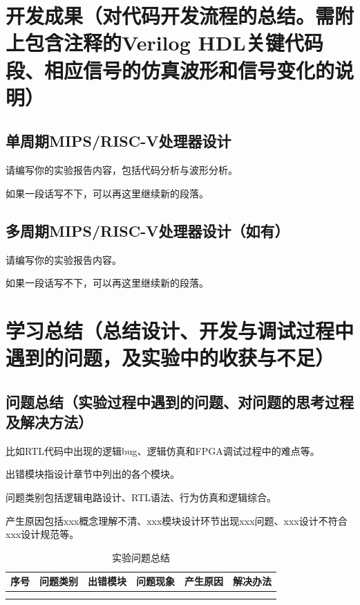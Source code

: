 \documentclass[11pt]{article}
\begin{document}
\section{开发成果（对代码开发流程的总结。需附上包含注释的Verilog HDL关键代码段、相应信号的仿真波形和信号变化的说明）}

\subsection{单周期MIPS/RISC-V处理器设计}
请编写你的实验报告内容，包括代码分析与波形分析。

如果一段话写不下，可以再这里继续新的段落。

\subsection{多周期MIPS/RISC-V处理器设计（如有）}
请编写你的实验报告内容。

如果一段话写不下，可以再这里继续新的段落。

\section{学习总结（总结设计、开发与调试过程中遇到的问题，及实验中的收获与不足）}

\subsection{问题总结（实验过程中遇到的问题、对问题的思考过程及解决方法）}

比如RTL代码中出现的逻辑bug、逻辑仿真和FPGA调试过程中的难点等。

出错模块指设计章节中列出的各个模块。

问题类别包括逻辑电路设计、RTL语法、行为仿真和逻辑综合。

产生原因包括xxx概念理解不清、xxx模块设计环节出现xxx问题、xxx设计不符合xxx设计规范等。

\begin{table}[h]
  \centering
  \begin{tabular}{c|c|c|c|c|c}
    序号 & 问题类别 & 出错模块 & 问题现象 & 产生原因 & 解决办法 \\
    \hline
       &      &      &      &      &      \\
    \hline
       &      &      &      &      &      \\
  \end{tabular}
  \caption{实验问题总结}
  \label{tab:placeholder}
\end{table}
\end{document}
